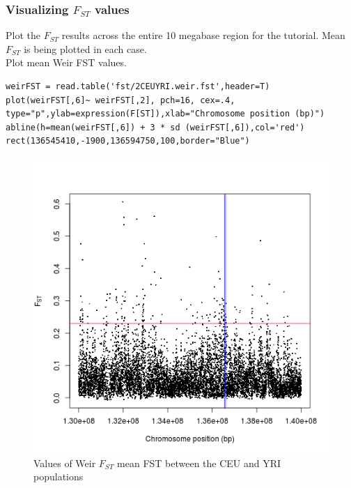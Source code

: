 \documentclass[a4paper,10pt]{article}
\begin{document}
\subsubsection{Visualizing $F_{ST}$ values}

\noindent
Plot the $F_{ST}$ results across the entire 10 megabase region for the tutorial.  Mean $F_{ST}$ is being plotted in each case.\\

\noindent
Plot mean Weir FST values.\\
\begin{verbatim}
weirFST = read.table('fst/2CEUYRI.weir.fst',header=T) 
plot(weirFST[,6]~ weirFST[,2], pch=16, cex=.4, 
type="p",ylab=expression(F[ST]),xlab="Chromosome position (bp)") 
abline(h=mean(weirFST[,6]) + 3 * sd (weirFST[,6]),col='red')
rect(136545410,-1900,136594750,100,border="Blue") 
\end{verbatim}

\begin{figure}
\centering
\includegraphics{pictures/WeirCEUYRI.png}
\caption{Values of Weir $F_{ST}$ mean FST between the CEU and YRI populations}
\label{fig:a}
\end{figure}
\end{document}
